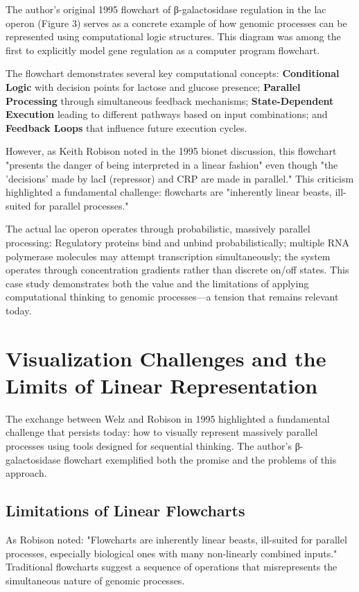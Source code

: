 \documentclass[11pt]{article}
\begin{document}
The author's original 1995 flowchart of β-galactosidase regulation in the lac operon (Figure 3) serves as a concrete example of how genomic processes can be represented using computational logic structures. This diagram was among the first to explicitly model gene regulation as a computer program flowchart.

The flowchart demonstrates several key computational concepts: \textbf{Conditional Logic} with decision points for lactose and glucose presence; \textbf{Parallel Processing} through simultaneous feedback mechanisms; \textbf{State-Dependent Execution} leading to different pathways based on input combinations; and \textbf{Feedback Loops} that influence future execution cycles.

However, as Keith Robison noted in the 1995 bionet discussion, this flowchart "presents the danger of being interpreted in a linear fashion" even though "the 'decisions' made by lacI (repressor) and CRP are made in parallel." This criticism highlighted a fundamental challenge: flowcharts are "inherently linear beasts, ill-suited for parallel processes."

The actual lac operon operates through probabilistic, massively parallel processing: Regulatory proteins bind and unbind probabilistically; multiple RNA polymerase molecules may attempt transcription simultaneously; the system operates through concentration gradients rather than discrete on/off states. This case study demonstrates both the value and the limitations of applying computational thinking to genomic processes—a tension that remains relevant today.

\section{Visualization Challenges and the Limits of Linear Representation}

The exchange between Welz and Robison in 1995 highlighted a fundamental challenge that persists today: how to visually represent massively parallel processes using tools designed for sequential thinking. The author's β-galactosidase flowchart exemplified both the promise and the problems of this approach.

\subsection{Limitations of Linear Flowcharts}

As Robison noted: "Flowcharts are inherently linear beasts, ill-suited for parallel processes, especially biological ones with many non-linearly combined inputs." Traditional flowcharts suggest a sequence of operations that misrepresents the simultaneous nature of genomic processes.
\end{document}
